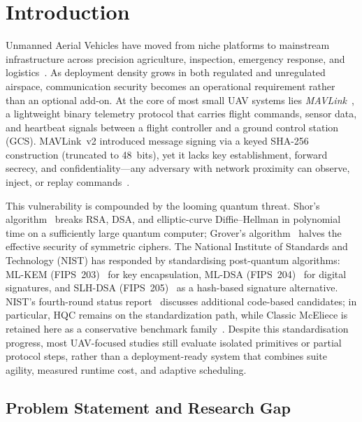 \documentclass[conference]{IEEEtran}
\newcommand{\mlkem}{\textsf{ML-KEM}}
\newcommand{\mldsa}{\textsf{ML-DSA}}
\newcommand{\slhdsa}{\textsf{SLH-DSA}}
\begin{document}
\section{Introduction}
\label{sec:intro}

Unmanned Aerial Vehicles have moved from niche platforms to mainstream infrastructure across precision agriculture, inspection, emergency response, and logistics~\cite{drone-security-survey}.
As deployment density grows in both regulated and unregulated airspace, communication security becomes an operational requirement rather than an optional add-on.
At the core of most small UAV systems lies \emph{MAVLink}~\cite{mavlink-spec}, a lightweight binary telemetry protocol that carries flight commands, sensor data, and heartbeat signals between a flight controller and a ground control station (GCS).
MAVLink~v2 introduced message signing via a keyed SHA-256 construction (truncated to 48~bits), yet it lacks key establishment, forward secrecy, and confidentiality---any adversary with network proximity can observe, inject, or replay commands~\cite{drone-pqc-analysis}.

This vulnerability is compounded by the looming quantum threat.
Shor's algorithm~\cite{shor1994} breaks RSA, DSA, and elliptic-curve Diffie--Hellman in polynomial time on a sufficiently large quantum computer; Grover's algorithm~\cite{grover1996} halves the effective security of symmetric ciphers.
The National Institute of Standards and Technology (NIST) has responded by standardising post-quantum algorithms: \mlkem{} (FIPS~203)~\cite{nist-fips203} for key encapsulation, \mldsa{} (FIPS~204)~\cite{nist-fips204} for digital signatures, and \slhdsa{} (FIPS~205)~\cite{nist-fips205} as a hash-based signature alternative.
NIST's fourth-round status report~\cite{nist-round4} discusses additional code-based candidates; in particular, HQC remains on the standardization path, while Classic McEliece is retained here as a conservative benchmark family~\cite{hqc,mceliece}.
Despite this standardisation progress, most UAV-focused studies still evaluate isolated primitives or partial protocol steps, rather than a deployment-ready system that combines suite agility, measured runtime cost, and adaptive scheduling.

\subsection{Problem Statement and Research Gap}
\end{document}
